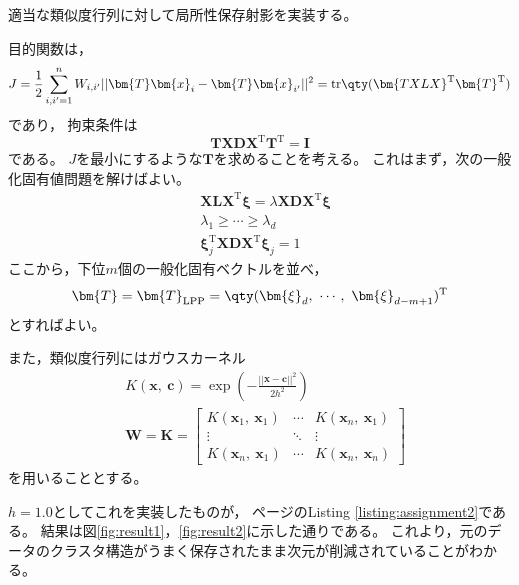 \documentclass[class=jsarticle, crop=false, dvipdfmx, fleqn]{standalone}
\begin{document}
\section{}

適当な類似度行列に対して局所性保存射影を実装する。

目的関数は，
\begin{equation}
    J = \frac{1}{2} \sum_{i, i' = 1}^{n} W_{i, i'} ||\bm{T} \bm{x}_i - \bm{T} \bm{x}_{i'}||^2
        = \mathrm{tr}\qty(\bm{TXLX}^\mathrm{T} \bm{T}^\mathrm{T})
\end{equation}
であり，
拘束条件は
\begin{equation}
    \bm{TXDX}^\mathrm{T} \bm{T}^\mathrm{T} = \bm{I}
\end{equation}
である。
\(J\)を最小にするような\(\bm{T}\)を求めることを考える。
これはまず，次の一般化固有値問題を解けばよい。
\begin{align}
    & \bm{XLX}^\mathrm{T} \bm{\xi} = \lambda \bm{XDX}^\mathrm{T} \bm{\xi} \\
    & \lambda_1 \ge \cdots \ge \lambda_d \\
    & \bm{\xi}_j^\mathrm{T} \bm{XDX}^\mathrm{T} \bm{\xi}_j = 1
\end{align}
ここから，下位\(m\)個の一般化固有ベクトルを並べ，
\begin{equation}
    \bm{T} = \bm{T}_\mathrm{LPP} = \qty(\bm{\xi}_d,\ \cdots,\ \bm{\xi}_{d-m+1})^\mathrm{T}
\end{equation}
とすればよい。

また，類似度行列にはガウスカーネル
\begin{align}
    & K(\bm{x},\ \bm{c}) = \exp(- \frac{||\bm{x} - \bm{c}||^2}{2 h^2}) \\
    & \bm{W} = \bm{K} =
        \begin{bmatrix}
            K(\bm{x}_1,\ \bm{x}_1) & \cdots & K(\bm{x}_{n},\ \bm{x}_1) \\
            \vdots & \ddots & \vdots \\
            K(\bm{x}_{n},\ \bm{x}_1) & \cdots & K(\bm{x}_{n},\ \bm{x}_{n})
        \end{bmatrix}
\end{align}
を用いることとする。

\(h = 1.0\)としてこれを実装したものが，
\pageref{listing:assignment2}ページのListing \ref{listing:assignment2}である。
結果は図\ref{fig:result1}，\ref{fig:result2}に示した通りである。
これより，元のデータのクラスタ構造がうまく保存されたまま次元が削減されていることがわかる。
\end{document}
